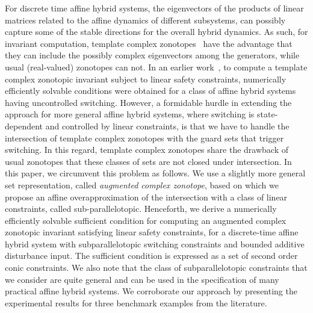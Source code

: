 

For discrete time affine hybrid systems, the eigenvectors of the
products of linear matrices related to the affine dynamics of
different subsystems, can possibly capture some of the stable
directions for the overall hybrid dynamics.  As such, for invariant
computation, template complex zonotopes~\cite{tcz2017} have the
advantage that they can include the possibly complex eigenvectors
among the generators, while usual (real-valued) zonotopes can not. In
an earlier work~\cite{tcz2017}, to compute a template complex
zonotopic invariant subject to linear safety constraints, numerically
efficiently solvable conditions were obtained for a class of affine
hybrid systems having uncontrolled switching. However, a formidable
hurdle in extending the approach for more general affine hybrid
systems, where switching is state-dependent and controlled by linear
constraints, is that we have to handle the intersection of template
complex zonotopes with the guard sets that trigger switching. In this
regard, template complex zonotopes share the drawback of usual
zonotopes that these classes of sets are not closed under
intersection. In this paper, we circumvent this problem as follows. We
use a slightly more general set representation, called \emph{augmented
complex zonotope}, based on which we propose an affine
overapproximation of the intersection with a class of linear
constraints, called sub-parallelotopic.  Henceforth, we derive a
numerically efficiently solvable sufficient condition for computing an
augmented complex zonotopic invariant satisfying linear safety
constraints, for a discrete-time affine hybrid system with
subparallelotopic switching constraints and bounded additive
disturbance input.  The sufficient condition is expressed as a set of
second order conic constraints.  We also note that the class of
subparallelotopic constraints that we consider are quite general and
can be used in the specification of many practical affine hybrid
systems. We corroborate our approach by presenting the experimental
results for three benchmark examples from the literature.\\


